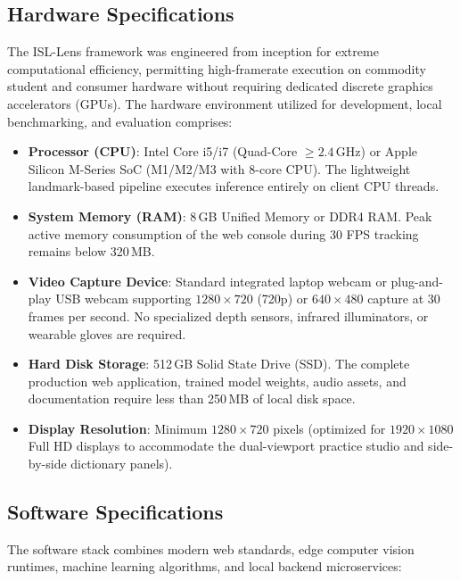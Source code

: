 \subsection{Hardware Specifications}
The ISL-Lens framework was engineered from inception for extreme computational efficiency, permitting high-framerate execution on commodity student and consumer hardware without requiring dedicated discrete graphics accelerators (GPUs). The hardware environment utilized for development, local benchmarking, and evaluation comprises:
\begin{itemize}
    \item \textbf{Processor (CPU)}: Intel Core i5/i7 (Quad-Core $\ge 2.4$\,GHz) or Apple Silicon M-Series SoC (M1/M2/M3 with 8-core CPU). The lightweight landmark-based pipeline executes inference entirely on client CPU threads.
    \item \textbf{System Memory (RAM)}: 8\,GB Unified Memory or DDR4 RAM. Peak active memory consumption of the web console during 30 FPS tracking remains below 320\,MB.
    \item \textbf{Video Capture Device}: Standard integrated laptop webcam or plug-and-play USB webcam supporting $1280 \times 720$ (720p) or $640 \times 480$ capture at 30 frames per second. No specialized depth sensors, infrared illuminators, or wearable gloves are required.
    \item \textbf{Hard Disk Storage}: 512\,GB Solid State Drive (SSD). The complete production web application, trained model weights, audio assets, and documentation require less than 250\,MB of local disk space.
    \item \textbf{Display Resolution}: Minimum $1280 \times 720$ pixels (optimized for $1920 \times 1080$ Full HD displays to accommodate the dual-viewport practice studio and side-by-side dictionary panels).
\end{itemize}

\subsection{Software Specifications}
The software stack combines modern web standards, edge computer vision runtimes, machine learning algorithms, and local backend microservices:


